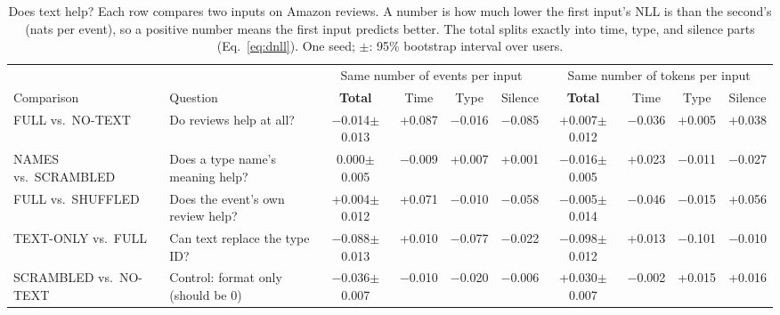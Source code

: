 \begin{table}[t]
\caption{Does text help? Each row compares two inputs on Amazon reviews. A number is how much lower the first input's NLL is than the second's (nats per event), so a positive number means the first input predicts better. The total splits exactly into time, type, and silence parts (Eq.~\ref{eq:dnll}). One seed; $\pm$: 95\% bootstrap interval over users.}
\label{tab:rq3cond}
\footnotesize\setlength{\tabcolsep}{3pt}
\begin{tabular}{@{}llcccccccc@{}}
\toprule
 & & \multicolumn{4}{c}{Same number of events per input} & \multicolumn{4}{c}{Same number of tokens per input}\\
\cmidrule(lr){3-6}\cmidrule(lr){7-10}
Comparison & Question & \textbf{Total} & Time & Type & Silence & \textbf{Total} & Time & Type & Silence\\
\midrule
FULL vs.\ NO-TEXT & Do reviews help at all? & $-$0.014{\tiny$\pm$0.013} & +0.087 & $-$0.016 & $-$0.085 & +0.007{\tiny$\pm$0.012} & $-$0.036 & +0.005 & +0.038\\
NAMES vs.\ SCRAMBLED & Does a type name's meaning help? & 0.000{\tiny$\pm$0.005} & $-$0.009 & +0.007 & +0.001 & $-$0.016{\tiny$\pm$0.005} & +0.023 & $-$0.011 & $-$0.027\\
FULL vs.\ SHUFFLED & Does the event's own review help? & +0.004{\tiny$\pm$0.012} & +0.071 & $-$0.010 & $-$0.058 & $-$0.005{\tiny$\pm$0.014} & $-$0.046 & $-$0.015 & +0.056\\
TEXT-ONLY vs.\ FULL & Can text replace the type ID? & $-$0.088{\tiny$\pm$0.013} & +0.010 & $-$0.077 & $-$0.022 & $-$0.098{\tiny$\pm$0.012} & +0.013 & $-$0.101 & $-$0.010\\
\midrule
SCRAMBLED vs.\ NO-TEXT & Control: format only (should be 0) & $-$0.036{\tiny$\pm$0.007} & $-$0.010 & $-$0.020 & $-$0.006 & +0.030{\tiny$\pm$0.007} & $-$0.002 & +0.015 & +0.016\\
\bottomrule
\end{tabular}
\end{table}
